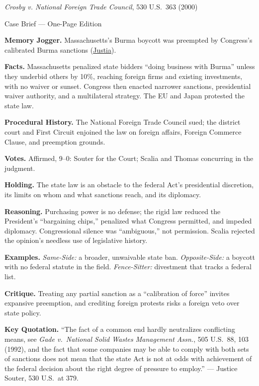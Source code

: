 \documentclass[12pt]{article}
\begin{document}
\begin{center}
{\Large \textit{Crosby v. National Foreign Trade Council}, 530 U.S.\ 363 (2000)\par}
\vspace{0.3em}
{\normalsize Case Brief --- One-Page Edition\par}
\end{center}

\textbf{Memory Jogger.} Massachusetts's Burma boycott was preempted by Congress's calibrated Burma sanctions (\href{https://supreme.justia.com/cases/federal/us/530/363/}{Justia}).

\textbf{Facts.} Massachusetts penalized state bidders ``doing business with Burma'' unless they underbid others by 10\%, reaching foreign firms and existing investments, with no waiver or sunset. Congress then enacted narrower sanctions, presidential waiver authority, and a multilateral strategy. The EU and Japan protested the state law.

\textbf{Procedural History.} The National Foreign Trade Council sued; the district court and First Circuit enjoined the law on foreign affairs, Foreign Commerce Clause, and preemption grounds.

\textbf{Votes.} Affirmed, 9--0: Souter for the Court; Scalia and Thomas concurring in the judgment.

\textbf{Holding.} The state law is an obstacle to the federal Act's presidential discretion, its limits on whom and what sanctions reach, and its diplomacy.

\textbf{Reasoning.} Purchasing power is no defense; the rigid law reduced the President's ``bargaining chips,'' penalized what Congress permitted, and impeded diplomacy. Congressional silence was ``ambiguous,'' not permission. Scalia rejected the opinion's needless use of legislative history.

\textbf{Examples.} \emph{Same-Side:} a broader, unwaivable state ban. \emph{Opposite-Side:} a boycott with no federal statute in the field. \emph{Fence-Sitter:} divestment that tracks a federal list.

\textbf{Critique.} Treating any partial sanction as a ``calibration of force'' invites expansive preemption, and crediting foreign protests risks a foreign veto over state policy.

\textbf{Key Quotation.} ``The fact of a common end hardly neutralizes conflicting means, see \textit{Gade v.\ National Solid Wastes Management Assn.}, 505 U.S.\ 88, 103 (1992), and the fact that some companies may be able to comply with both sets of sanctions does not mean that the state Act is not at odds with achievement of the federal decision about the right degree of pressure to employ.'' --- Justice Souter, 530 U.S.\ at 379.
\end{document}
